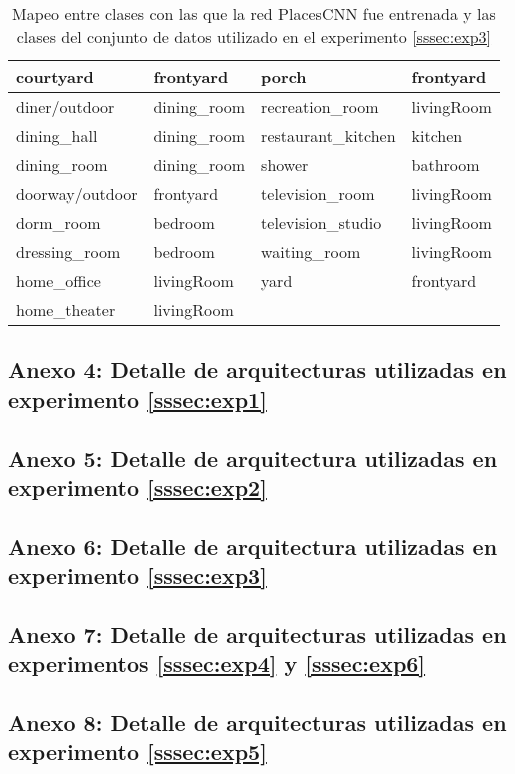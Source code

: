 \begin{table}[h!]
\begin{tabular}{||l|l||l|l||}
		courtyard &    frontyard &               porch &   frontyard \\
		\midrule
		diner/outdoor &  dining\_room &     recreation\_room &  livingRoom \\
		\midrule
		dining\_hall &  dining\_room &  restaurant\_kitchen &     kitchen \\
		\midrule
		dining\_room &  dining\_room &              shower &    bathroom \\
		\midrule
		doorway/outdoor &    frontyard &     television\_room &  livingRoom \\
		\midrule
		dorm\_room &      bedroom &   television\_studio &  livingRoom \\
		\midrule
		dressing\_room &      bedroom &        waiting\_room &  livingRoom \\
		\midrule
		home\_office &   livingRoom &                yard &   frontyard \\
		\midrule
		home\_theater &  livingRoom & & \\
		\bottomrule
	\end{tabular}
	\caption{Mapeo entre clases con las que la red PlacesCNN fue entrenada y las clases del conjunto de datos utilizado en el experimento \ref{sssec:exp3}}
\label{anexo:exp3:mapping}
\end{table}



\subsection{Anexo 4: Detalle de arquitecturas utilizadas en experimento \ref{sssec:exp1}}\label{ssec:anexo4}

\subsection{Anexo 5: Detalle de arquitectura utilizadas en experimento \ref{sssec:exp2}}\label{ssec:anexo5}

\subsection{Anexo 6: Detalle de arquitectura utilizadas en experimento \ref{sssec:exp3}}\label{ssec:anexo6}

\subsection{Anexo 7: Detalle de arquitecturas utilizadas en experimentos \ref{sssec:exp4} y \ref{sssec:exp6}}\label{ssec:anexo7}

\subsection{Anexo 8: Detalle de arquitecturas utilizadas en experimento \ref{sssec:exp5}}\label{ssec:anexo8}


